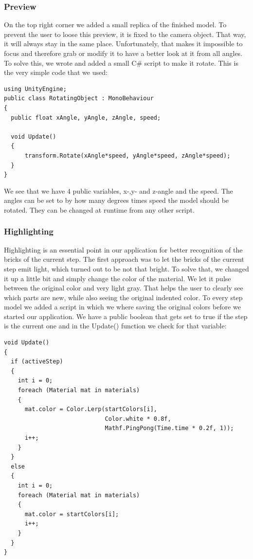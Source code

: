 \subsubsection{Preview}
On the top right corner we added a small replica of the finished  model. To prevent the user to loose this preview, it is fixed to the camera object. That way, it will always stay in the same place. Unfortunately, that makes it impossible to focus and therefore grab or modify it to have a better look at it from all angles. To solve this, we wrote and added a small C\# script to make it rotate.
This is the very simple code that we used:

\begin{verbatim}
using UnityEngine;
public class RotatingObject : MonoBehaviour
{
  public float xAngle, yAngle, zAngle, speed;
	
  void Update()
  {
      transform.Rotate(xAngle*speed, yAngle*speed, zAngle*speed);
  }
}
\end{verbatim}

We see that we have 4 public variables, x-,y- and z-angle and the speed. The angles can be set to by how many degrees times speed the model should be rotated. They can be changed at runtime from any other script.

\subsubsection{Highlighting} 
Highlighting is an essential point in our application for better recognition of the bricks of the current step. The first approach was to let the bricks of the current step emit light, which turned out to be not that bright. To solve that, we changed it up a little bit and simply change the color of the material. We let it pulse between the original color and very light gray. That helps the user to clearly see which parts are new, while also seeing the original indented color. To every step model we added a script in which we where saving the original colors before we started our application. We have a public boolean that gets set to true if the step is the current one and in the Update() function we check for that variable:
\begin{verbatim}
void Update()
{
  if (activeStep)
  {
    int i = 0;
    foreach (Material mat in materials)
    {
      mat.color = Color.Lerp(startColors[i],
                             Color.white * 0.8f,
                             Mathf.PingPong(Time.time * 0.2f, 1));
      i++;
    }
  }
  else
  {
    int i = 0;
    foreach (Material mat in materials)
    {
      mat.color = startColors[i];
      i++;
    }
  }
}
\end{verbatim}

